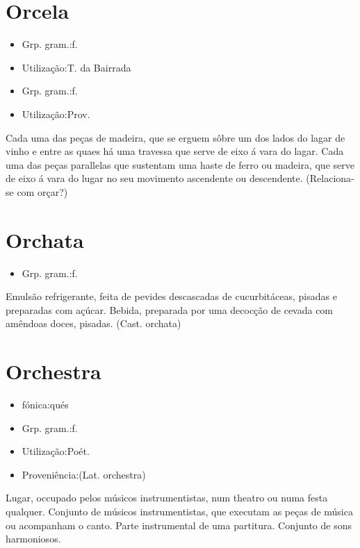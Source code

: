 \section{Orcela}
\begin{itemize}
\item {Grp. gram.:f.}
\end{itemize}
\begin{itemize}
\item {Utilização:T. da Bairrada}
\end{itemize}
\begin{itemize}
\item {Grp. gram.:f.}
\end{itemize}
\begin{itemize}
\item {Utilização:Prov.}
\end{itemize}
Cada uma das peças de madeira, que se erguem sôbre um dos lados do lagar de vinho e entre as quaes há uma travessa que serve de eixo á vara do lagar.
Cada uma das peças parallelas que sustentam uma haste de ferro ou madeira, que serve de eixo á vara do lugar no seu movimento ascendente ou descendente.
(Relaciona-se com \textunderscore orçar\textunderscore ?)
\section{Orchata}
\begin{itemize}
\item {Grp. gram.:f.}
\end{itemize}
Emulsão refrigerante, feita de pevides descascadas de cucurbitáceas, pisadas e preparadas com açúcar.
Bebida, preparada por uma decocção de cevada com amêndoas doces, pisadas.
(Cast. \textunderscore orchata\textunderscore )
\section{Orchestra}
\begin{itemize}
\item {fónica:qués}
\end{itemize}
\begin{itemize}
\item {Grp. gram.:f.}
\end{itemize}
\begin{itemize}
\item {Utilização:Poét.}
\end{itemize}
\begin{itemize}
\item {Proveniência:(Lat. \textunderscore orchestra\textunderscore )}
\end{itemize}
Lugar, occupado pelos músicos instrumentistas, num theatro ou numa festa qualquer.
Conjunto de músicos instrumentistas, que executam as peças de música ou acompanham o canto.
Parte instrumental de uma partitura.
Conjunto de sons harmoniosos.
